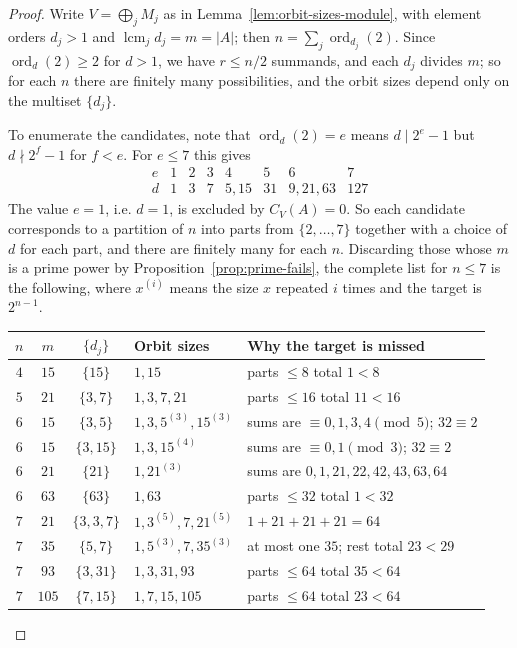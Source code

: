 \documentclass[11pt]{article}
\theoremstyle{definition}
\theoremstyle{remark}
\begin{document}
\begin{proof}
Write $V=\bigoplus_jM_j$ as in Lemma~\ref{lem:orbit-sizes-module}, with
element orders $d_j>1$ and $\operatorname{lcm}_jd_j=m=|A|$; then
$n=\sum_j\operatorname{ord}_{d_j}(2)$.  Since
$\operatorname{ord}_{d}(2)\ge2$ for $d>1$, we have $r\le n/2$
summands, and each $d_j$ divides $m$; so for each $n$ there are
finitely many possibilities, and the orbit sizes depend only on the
multiset $\{d_j\}$.

To enumerate the candidates, note that $\operatorname{ord}_d(2)=e$ means
$d\mid2^e-1$ but $d\nmid2^f-1$ for $f<e$.  For $e\le7$ this gives
\[
 \begin{array}{c|ccccccc}
 e&1&2&3&4&5&6&7\\\hline
 d&1&3&7&5,15&31&9,21,63&127
 \end{array}
\]
The value $e=1$, i.e. $d=1$, is excluded by $C_V(A)=0$.  So each
candidate corresponds to a partition of $n$ into parts from
$\{2,\dots,7\}$ together with a choice of $d$ for each part, and there
are finitely many for each $n$.  Discarding those whose $m$ is a prime
power by Proposition~\ref{prop:prime-fails}, the complete list for
$n\le7$ is the
following, where $x^{(i)}$ means the size $x$ repeated $i$ times and the
target is $2^{n-1}$.

\begin{center}
\begin{tabular}{@{}cccll@{}}
\toprule
$n$ & $m$ & $\{d_j\}$ & Orbit sizes & Why the target is missed\\
\midrule
$4$ & $15$ & $\{15\}$ & $1,15$ & parts $\le8$ total $1<8$\\
$5$ & $21$ & $\{3,7\}$ & $1,3,7,21$ & parts $\le16$ total $11<16$\\
$6$ & $15$ & $\{3,5\}$ & $1,3,5^{(3)},15^{(3)}$
 & sums are $\equiv0,1,3,4\pmod5$; $32\equiv2$\\
$6$ & $15$ & $\{3,15\}$ & $1,3,15^{(4)}$
 & sums are $\equiv0,1\pmod3$; $32\equiv2$\\
$6$ & $21$ & $\{21\}$ & $1,21^{(3)}$
 & sums are $0,1,21,22,42,43,63,64$\\
$6$ & $63$ & $\{63\}$ & $1,63$ & parts $\le32$ total $1<32$\\
$7$ & $21$ & $\{3,3,7\}$ & $1,3^{(5)},7,21^{(5)}$
 & \textbf{$1+21+21+21=64$}\\
$7$ & $35$ & $\{5,7\}$ & $1,5^{(3)},7,35^{(3)}$
 & at most one $35$; rest total $23<29$\\
$7$ & $93$ & $\{3,31\}$ & $1,3,31,93$
 & parts $\le64$ total $35<64$\\
$7$ & $105$ & $\{7,15\}$ & $1,7,15,105$
 & parts $\le64$ total $23<64$\\
\bottomrule
\end{tabular}
\end{center}


\end{proof}
\end{document}
